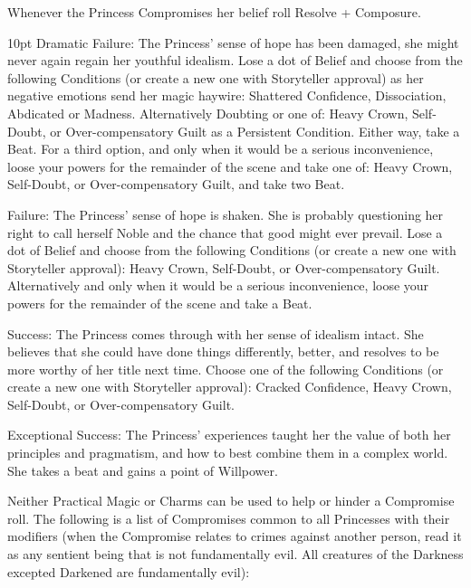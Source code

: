 \noindent  Whenever the Princess Compromises her belief roll Resolve + Composure. 

\begin{myindentpar}{10pt}
Dramatic Failure: The Princess' sense of hope has been damaged, she might never again regain her youthful idealism. Lose a dot of Belief and choose from the following Conditions  (or create a new one with Storyteller approval) as her negative emotions send her magic haywire: Shattered Confidence, Dissociation, Abdicated or Madness. Alternatively Doubting or one of: Heavy Crown, Self-Doubt, or Over-compensatory Guilt as a Persistent Condition. Either way, take a Beat. For a third option, and only when it would be a serious inconvenience, loose your powers for the remainder of the scene and take one of: Heavy Crown, Self-Doubt, or Over-compensatory Guilt, and take two Beat. 

Failure: The Princess' sense of hope is shaken. She is probably questioning her right to call herself Noble and the chance that good might ever prevail. Lose a dot of Belief and choose from the following Conditions (or create a new one with Storyteller approval): Heavy Crown, Self-Doubt, or Over-compensatory Guilt. Alternatively and only when it would be a serious inconvenience, loose your powers for the remainder of the scene and take a Beat. 

Success: The Princess comes through with her sense of idealism intact. She believes that she could have done things differently, better, and resolves to be more worthy of her title next time. Choose one of the following Conditions (or create a new one with Storyteller approval): Cracked Confidence, Heavy Crown, Self-Doubt, or Over-compensatory Guilt.

Exceptional Success: The Princess' experiences taught her the value of both her principles and pragmatism, and how to best combine them in a complex world. She takes a beat and gains a point of Willpower. \end{myindentpar}

\noindent Neither Practical Magic or Charms can be used to help or hinder a Compromise roll. The following is a list of Compromises common to all Princesses with their modifiers (when the Compromise relates to crimes against another person, read it as any sentient being that is not fundamentally evil. All creatures of the Darkness excepted Darkened are fundamentally evil): 

